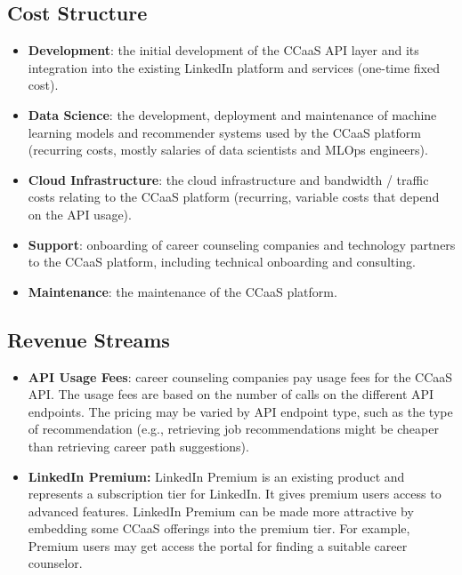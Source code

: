 \subsection{Cost Structure}

\begin{itemize}
    \item \textbf{Development}: the initial development of the CCaaS API layer and its integration into the
            existing LinkedIn platform and services (one-time fixed cost). 
    \item \textbf{Data Science}: the development, deployment and maintenance of machine learning
        models and recommender systems used by the CCaaS platform (recurring costs, mostly salaries 
        of data scientists and MLOps engineers).
    \item \textbf{Cloud Infrastructure}: the cloud infrastructure and bandwidth / traffic costs 
        relating to the CCaaS platform (recurring, variable costs that depend on the API usage).
    \item \textbf{Support}: onboarding of career counseling companies and technology partners
        to the CCaaS platform, including technical onboarding and consulting.
    \item \textbf{Maintenance}: the maintenance of the CCaaS platform.
\end{itemize}

\subsection{Revenue Streams}

\begin{itemize}
    \item \textbf{API Usage Fees}: career counseling companies pay usage fees for the CCaaS API.
        The usage fees are based on the number of calls on the different API endpoints. The pricing
        may be varied by API endpoint type, such as the type of recommendation (e.g., retrieving
        job recommendations might be cheaper than retrieving career path suggestions).
     \item \textbf{LinkedIn Premium:} LinkedIn Premium is an existing product and represents a subscription
        tier for LinkedIn. It gives premium users  access to advanced features. LinkedIn Premium can be made
        more attractive by embedding some CCaaS offerings into the premium tier. For example, Premium
        users may get access the portal for finding a suitable career counselor. 
\end{itemize}
